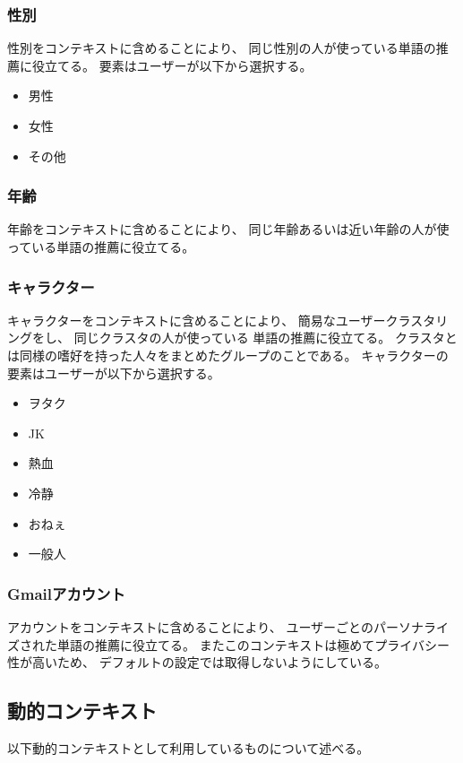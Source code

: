 \subsubsection{性別}
性別をコンテキストに含めることにより、
同じ性別の人が使っている単語の推薦に役立てる。
要素はユーザーが以下から選択する。
\begin{itemize}
  \item 男性
  \item 女性
  \item その他
\end{itemize}

\subsubsection{年齢}
年齢をコンテキストに含めることにより、
同じ年齢あるいは近い年齢の人が使っている単語の推薦に役立てる。

\subsubsection{キャラクター}
キャラクターをコンテキストに含めることにより、
簡易なユーザークラスタリングをし、
同じクラスタの人が使っている
単語の推薦に役立てる。
クラスタとは同様の嗜好を持った人々をまとめたグループのことである。
キャラクターの要素はユーザーが以下から選択する。
\begin{itemize}
  \item ヲタク
  \item JK
  \item 熱血
  \item 冷静
  \item おねぇ
  \item 一般人
\end{itemize}

\subsubsection{Gmailアカウント}
アカウントをコンテキストに含めることにより、
ユーザーごとのパーソナライズされた単語の推薦に役立てる。
またこのコンテキストは極めてプライバシー性が高いため、
デフォルトの設定では取得しないようにしている。

\subsection{動的コンテキスト}
\label{dynamiccontext}
以下動的コンテキストとして利用しているものについて述べる。

